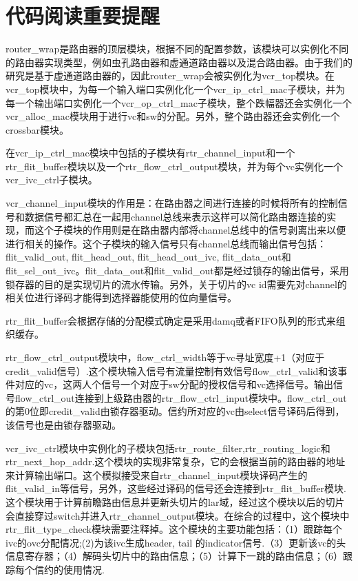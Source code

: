 ﻿\documentclass[10pt,journal]{IEEEtran}
\begin{document}
\section{代码阅读重要提醒}
router\_wrap是路由器的顶层模块，根据不同的配置参数，该模块可以实例化不同的路由器实现类型，例如虫孔路由器和虚通道路由器以及混合路由器。由于我们的研究是基于虚通道路由器的，因此router\_wrap会被实例化为vcr\_top模块。在vcr\_top模块中，为每一个输入端口实例化化一个vcr\_ip\_ctrl\_mac子模块，并为每一个输出端口实例化一个vcr\_op\_ctrl\_mac子模块，整个跌幅器还会实例化一个vcr\_alloc\_mac模块用于进行vc和sw的分配。另外，整个路由器还会实例化一个crossbar模块。

在vcr\_ip\_ctrl\_mac模块中包括的子模块有rtr\_channel\_input和一个rtr\_flit\_buffer模块以及一个rtr\_flow\_ctrl\_output模块，并为每个vc实例化一个vcr\_ivc\_ctrl子模块。

vcr\_channel\_input模块的作用是：在路由器之间进行连接的时候将所有的控制信号和数据信号都汇总在一起用channel总线来表示这样可以简化路由器连接的实现，而这个子模块的作用则是在路由器内部将channel总线中的信号剥离出来以便进行相关的操作。这个子模块的输入信号只有channel总线而输出信号包括：flit\_valid\_out, flit\_head\_out, flit\_head\_out\_ivc, flit\_data\_out和flit\_sel\_out\_ivc。flit\_data\_out和flit\_valid\_out都是经过锁存的输出信号，采用锁存器的目的是实现切片的流水传输。另外，关于切片的vc id需要先对channel的相关位进行译码才能得到选择器能使用的位向量信号。

rtr\_flit\_buffer会根据存储的分配模式确定是采用damq或者FIFO队列的形式来组织缓存。

rtr\_flow\_ctrl\_output模块中，flow\_ctrl\_width等于vc寻址宽度+1（对应于credit\_valid信号）.这个模块输入信号有流量控制有效信号flow\_ctrl\_valid和该事件对应的vc，这两人个信号一个对应于sw分配的授权信号和vc选择信号。输出信号flow\_ctrl\_out连接到上级路由器的rtr\_flow\_ctrl\_input模块中。flow\_ctrl\_out的第0位即credit\_valid由锁存器驱动。信约所对应的vc由select信号译码后得到，该信号也是由锁存器驱动。

vcr\_ivc\_ctrl模块中实例化的子模块包括rtr\_route\_filter,rtr\_routing\_logic和rtr\_next\_hop\_addr.这个模块的实现非常复杂，它的会根据当前的路由器的地址来计算输出端口。这个模拟接受来自rtr\_channel\_input模块译码产生的flit\_valid\_in等信号，另外，这些经过译码的信号还会连接到rtr\_flit\_buffer模块.这个模块用于计算前瞻路由信息并更新头切片的lar域，经过这个模块以后的切片会直接穿过switch并进入rtr\_channel\_output模块。在综合的过程中，这个模块中rtr\_flit\_type\_check模块需要注释掉。这个模块的主要功能包括：（1）跟踪每个ivc的ovc分配情况;(2)为该ivc生成header, tail 的indicator信号.（3）更新该vc的头信息寄存器；（4）解码头切片中的路由信息；（5）计算下一跳的路由信息；（6）跟踪每个信约的使用情况. 
\end{document}
